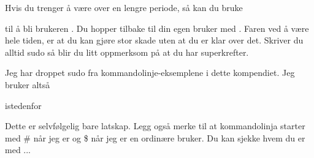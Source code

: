 Hvis du trenger å være  over en lengre periode, så kan du bruke 


til å bli brukeren . Du hopper tilbake til din egen bruker med .
Faren ved å være  hele tiden, er at du kan gjøre stor skade uten at du er klar over
det. Skriver du alltid sudo så blir du litt oppmerksom på at du har superkrefter.

\begin{remark}
Jeg har droppet sudo fra kommandolinje-eksemplene i dette kompendiet. Jeg bruker altså


istedenfor


Dette er selvfølgelig bare latskap. Legg også merke til at kommandolinja starter 
med \# når jeg er  og \$ når jeg er en ordinære bruker. 
Du kan sjekke hvem du er med  ...
\end{remark}

